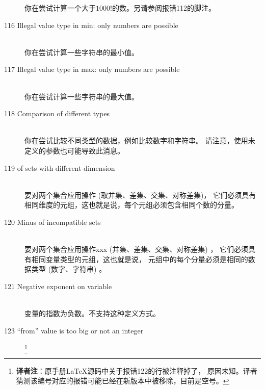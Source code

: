 \begin{description}
   你在尝试计算一个大于$1000!$的数。另请参阅报错112的脚注。
\item[116 Illegal value type in min: \code{xxx} only numbers are possible]\ \\
   你在尝试计算一些字符串的最小值。
\item[117 Illegal value type in max: \code{xxx} only numbers are possible]\ \\
   你在尝试计算一些字符串的最大值。
\item[118 Comparison of different types]\ \\
   你在尝试比较不同类型的数据，例如比较数字和字符串。
   请注意，使用未定义的参数也可能导致此消息。
\item[119 \code{xxx} of sets with different dimension]\ \\
   要对两个集合应用操作 (取并集、差集、交集、对称差集)，
   它们必须具有相同维度的元组，这也就是说，每个元组必须包含相同个数的分量。
\item[120 Minus of incompatible sets]\ \\
   要对两个集合应用操作xxx (并集、差集、交集、对称差集) ，
   它们必须具有相同变量类型的元组，这也就是说，
   元组中的每个分量必须是相同的数据类型 (数字、字符串) 。
\item[121 Negative exponent on variable]\ \\
   变量的指数为负数。不支持这种定义方式。
\item[123 ``from'' value \code{xxx} is too big or not an integer]\footnote{
     \textbf{译者注}：原手册\LaTeX 源码中关于报错122的行被注释掉了，
     原因未知。译者猜测该编号对应的报错可能已经在新版本中被移除，目前是空号。
}
\end{description}
